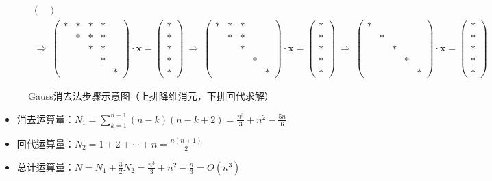 \documentclass[opensource,b5paper,sourcefont]{qyxf-book}
\newcommand{\tl}{\setlength{\itemsep}{0pt}\setlength{\parskip}{0pt}}
\begin{document}
\begin{figure}[htbp]
\begin{align*}
\begin{pmatrix}
\end{pmatrix}\\[0.5ex]\scriptstyle
{\displaystyle\ \Rightarrow\ }
\begin{pmatrix}
\ast & \ast & \ast & \ast &      \\
     & \ast & \ast & \ast &      \\
     &      & \ast & \ast &      \\
     &      &      & \ast &      \\
     &      &      &      & \ast
\end{pmatrix}
\cdot \mathbf{\displaystyle x =}
\begin{pmatrix}
\ast \\ \ast \\ \ast \\ \ast \\ \ast
\end{pmatrix}
{\displaystyle\ \Rightarrow\ }
\begin{pmatrix}
\ast & \ast & \ast &      &      \\
     & \ast & \ast &      &      \\
     &      & \ast &      &      \\
     &      &      & \ast &      \\
     &      &      &      & \ast
\end{pmatrix}
\cdot \mathbf{\displaystyle x =}
\begin{pmatrix}
\ast \\ \ast \\ \ast \\ \ast \\ \ast
\end{pmatrix}
{\displaystyle\ \Rightarrow\ }
\begin{pmatrix}
\ast &      &      &      &      \\
     & \ast &      &      &      \\
     &      & \ast &      &      \\
     &      &      & \ast &      \\
     &      &      &      & \ast
\end{pmatrix}
\cdot \mathbf{\displaystyle x =}
\begin{pmatrix}
\ast \\ \ast \\ \ast \\ \ast \\ \ast
\end{pmatrix}
\end{align*}
\caption{Gauss消去法步骤示意图（上排降维消元，下排回代求解）}\label{2-f1}
\end{figure}
\begin{itemize}\tl
\item 消去运算量：$N_1=\sum\limits_{k=1}^{n-1}(n-k)(n-k+2)=\frac{n^3}3+n^2-\frac{5n}6$
\item 回代运算量：$N_2=1+2+\cdots+n=\frac{n(n+1)}2$
\item 总计运算量：$N=N_1+\frac32N_2=\frac{n^3}3+n^2-\frac n3=O(n^3)$
\end{itemize}
\end{document}
